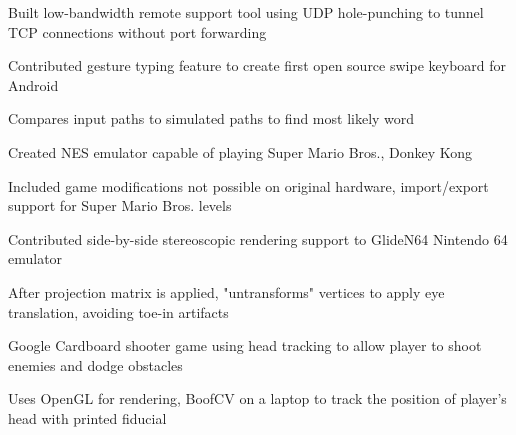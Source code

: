 \documentclass[12pt]{jmichaud-resume}
\begin{document}
 \hfill {}
\begin{tightemize}
	\item Built low-bandwidth remote support tool using UDP hole-punching to tunnel TCP connections without port forwarding
\end{tightemize}
\sectionsep

 \hfill {}

\sectionsepp

 \hfill
{}
\begin{tightemize}
	\item Contributed gesture typing feature to create first open source swipe keyboard for Android
	\item Compares input paths to simulated paths to find most likely word
\end{tightemize}

\sectionsep

 \hfill
{}
\begin{tightemize}
	\item Created NES emulator capable of playing Super Mario Bros., Donkey Kong
	\item Included game modifications not possible on original hardware, import/export support for Super Mario Bros. levels
\end{tightemize}

\sectionsep

 \hfill
{}
\begin{tightemize}
	\item Contributed side-by-side stereoscopic rendering support to GlideN64 Nintendo 64 emulator
	\item After projection matrix is applied, "untransforms" vertices to apply eye translation, avoiding toe-in artifacts
\end{tightemize}
\sectionsep

 \hfill
{}
\begin{tightemize}
	\item Google Cardboard shooter game using head tracking to allow player to shoot enemies and dodge obstacles
	\item Uses OpenGL for rendering, BoofCV on a laptop to track the position of player’s head with printed fiducial
\end{tightemize}
\end{document}
